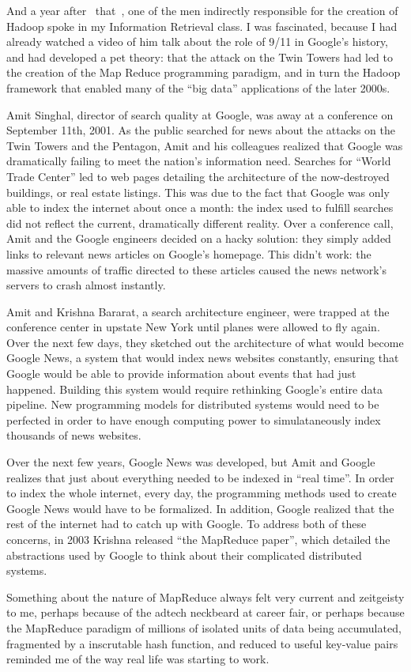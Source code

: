 \documentclass[12pt]{article}
\begin{document}
And a year after ~that~, one of the men indirectly responsible for the
creation of Hadoop spoke in my Information Retrieval class.  I was
fascinated, because I had already watched a video of him talk about the
role of 9/11 in Google's history, and had developed a pet theory: that
the attack on the Twin Towers had led to the creation of the Map Reduce
programming paradigm, and in turn the Hadoop framework that enabled many
of the ``big data'' applications of the later 2000s.

Amit Singhal, director of search quality at Google, was away at a
conference on September 11th, 2001. As the public searched for news
about the attacks on the Twin Towers and the Pentagon, Amit and his
colleagues realized that Google was dramatically failing to meet the nation's
information need. Searches for ``World Trade Center'' led to web pages
detailing the architecture of the now-destroyed buildings, or real
estate listings.  This was due to the fact that Google was only able to
index the internet about once a month: the index used to fulfill
searches did not reflect the current, dramatically different reality.
Over a conference call, Amit and the Google engineers decided on a hacky
solution: they simply added links to relevant news articles on Google's
homepage.  This didn't work: the massive amounts of traffic directed to
these articles caused the news network's servers to crash almost
instantly.

Amit and Krishna Bararat, a search architecture engineer, were trapped
at the conference center in upstate New York until planes were allowed
to fly again.  Over the next few days, they sketched out the
architecture of what would become Google News, a system that would index
news websites constantly, ensuring that Google would be able to provide
information about events that had just happened.  Building this system
would require rethinking Google's entire data pipeline.  New programming
models for distributed systems would need to be perfected in order to
have enough computing power to simulataneously index thousands of news
websites.

Over the next few years, Google News was developed, but Amit and Google
realizes that just about everything needed to be indexed in ``real time''.
In order to index the whole internet, every day, the programming methods
used to create Google News would have to be formalized.  In addition,
Google realized that the rest of the internet had to catch up with
Google.  To address both of these concerns, in 2003 Krishna released
``the MapReduce paper'', which detailed the abstractions used by Google to
think about their complicated distributed systems.  

Something about the nature of MapReduce always felt very current and
zeitgeisty to me, perhaps because of the adtech neckbeard at career
fair, or perhaps because the MapReduce paradigm of millions of isolated
units of data being accumulated, fragmented by a inscrutable hash
function, and reduced to useful key-value pairs reminded me of the way
real life was starting to work.
\end{document}
